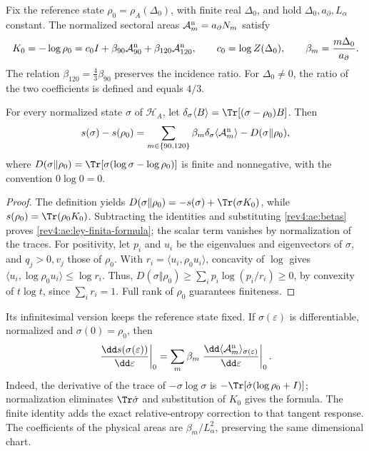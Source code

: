 Fix the reference state \(\rho_0=\rho_A(\Delta_0)\), with
finite real \(\Delta_0\), and hold
\(\Delta_0,a_\partial,L_\alpha\) constant. The normalized sectoral
areas \(\mathcal A_m^{\rm n}=a_\partial N_m\) satisfy
\begin{equation}
 K_0=-\log\rho_0=c_0I+
 \beta_{90}\mathcal A_{90}^{\rm n}
 +\beta_{120}\mathcal A_{120}^{\rm n},
 \qquad c_0=\log Z(\Delta_0),\qquad
 \beta_m=\frac{m\Delta_0}{a_\partial}.
 \label{rev4:ae:betas}
\end{equation}
The relation \(\beta_{120}=\tfrac43\beta_{90}\) preserves the incidence
ratio. For \(\Delta_0\ne0\), the ratio of the two coefficients
is defined and equals \(4/3\).

\begin{theorem}
\label{rev4:ae:ley-finita}
For every normalized state \(\sigma\) of \(\mathscr H_A\), let
\(\delta_\sigma\langle B\rangle=\Tr[(\sigma-\rho_0)B]\).
Then
\begin{equation}
 s(\sigma)-s(\rho_0)
 =\sum_{m\in\{90,120\}}\beta_m
       \delta_\sigma\langle\mathcal A_m^{\rm n}\rangle
   -D(\sigma\Vert\rho_0),
 \label{rev4:ae:ley-finita-formula}
\end{equation}
where \(D(\sigma\Vert\rho_0)=
\Tr[\sigma(\log\sigma-\log\rho_0)]\) is finite and nonnegative,
with the convention \(0\log0=0\).
\end{theorem}
\begin{proof}
The definition yields
\(D(\sigma\Vert\rho_0)=-s(\sigma)+\Tr(\sigma K_0)\),
while \(s(\rho_0)=\Tr(\rho_0K_0)\). Subtracting the identities
and substituting \eqref{rev4:ae:betas} proves
\eqref{rev4:ae:ley-finita-formula}; the scalar term vanishes
by normalization of the traces. For positivity, let \(p_i\)
and \(u_i\) be the eigenvalues and eigenvectors of \(\sigma\), and
\(q_j>0,v_j\) those of \(\rho_0\). With
\(r_i=\langle u_i,\rho_0u_i\rangle\), concavity of
\(\log\) gives
\(\langle u_i,\log\rho_0u_i\rangle\le\log r_i\).
Thus, \(D(\sigma\Vert\rho_0)\ge\sum_i p_i\log(p_i/r_i)\ge0\),
by convexity of \(t\log t\), since \(\sum_i r_i=1\).
Full rank of \(\rho_0\) guarantees finiteness.
\end{proof}

Its infinitesimal version keeps the reference state fixed. If
\(\sigma(\varepsilon)\) is differentiable, normalized and
\(\sigma(0)=\rho_0\), then
\[
 \left.\frac{\dd s(\sigma(\varepsilon))}{\dd\varepsilon}\right|_0
 =\sum_m\beta_m
  \left.\frac{\dd\langle\mathcal A_m^{\rm n}\rangle_{
                          \sigma(\varepsilon)}}{\dd\varepsilon}\right|_0.
\]
Indeed, the derivative of the trace of \(-\sigma\log\sigma\) is
\(-\Tr[\dot\sigma(\log\rho_0+I)]\); normalization eliminates
\(\Tr\dot\sigma\) and substitution of \(K_0\) gives the formula.
The finite identity adds the exact relative-entropy correction
to that tangent response. The coefficients of the physical areas are
\(\beta_m/L_\alpha^2\), preserving the same dimensional chart.

